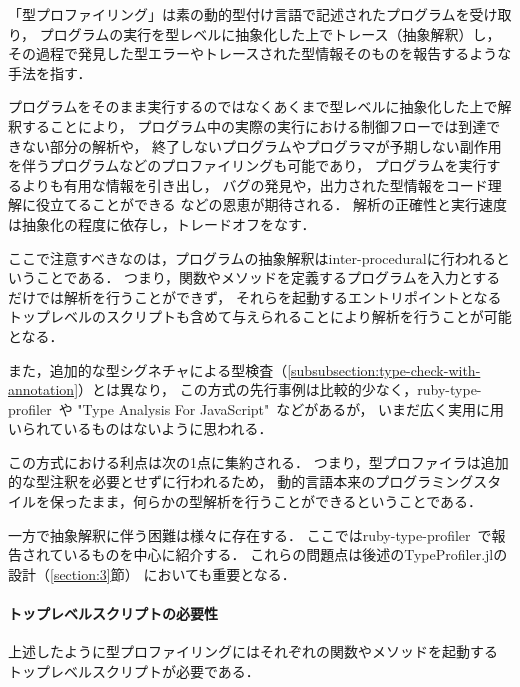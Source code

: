 「型プロファイリング」は素の動的型付け言語で記述されたプログラムを受け取り，
プログラムの実行を型レベルに抽象化した上でトレース（抽象解釈）し，
その過程で発見した型エラーやトレースされた型情報そのものを報告するような手法を指す．

プログラムをそのまま実行するのではなくあくまで型レベルに抽象化した上で解釈することにより，
プログラム中の実際の実行における制御フローでは到達できない部分の解析や，
終了しないプログラムやプログラマが予期しない副作用を伴うプログラムなどのプロファイリングも可能であり，
プログラムを実行するよりも有用な情報を引き出し，
バグの発見や，出力された型情報をコード理解に役立てることができる
などの恩恵が期待される\footnotemark[\value{footnote}]．
解析の正確性と実行速度は抽象化の程度に依存し，トレードオフをなす．

ここで注意すべきなのは，プログラムの抽象解釈はinter-proceduralに行われるということである．
つまり，関数やメソッドを定義するプログラムを入力とするだけでは解析を行うことができず，
それらを起動するエントリポイントとなるトップレベルのスクリプトも含めて与えられることにより解析を行うことが可能となる．

また，追加的な型シグネチャによる型検査（\ref{subsubsection:type-check-with-annotation}）とは異なり，
この方式の先行事例は比較的少なく，ruby-type-profiler~\cite{ruby-type-profiler}や
"Type Analysis For JavaScript"~\cite{type-analysis-for-javascript}などがあるが，
いまだ広く実用に用いられているものはないように思われる．\

この方式における利点は次の1点に集約される．
つまり，型プロファイラは追加的な型注釈を必要とせずに行われるため，
動的言語本来のプログラミングスタイルを保ったまま，何らかの型解析を行うことができるということである．

一方で抽象解釈に伴う困難は様々に存在する．
ここではruby-type-profiler~\cite{ruby-progress-report, ruby-type-profiler}で報告されているものを中心に紹介する．
これらの問題点は後述のTypeProfiler.jlの設計（\ref{section:3}節）
においても重要となる．

\paragraph{トップレベルスクリプトの必要性}

上述したように型プロファイリングにはそれぞれの関数やメソッドを起動する
トップレベルスクリプトが必要である．

